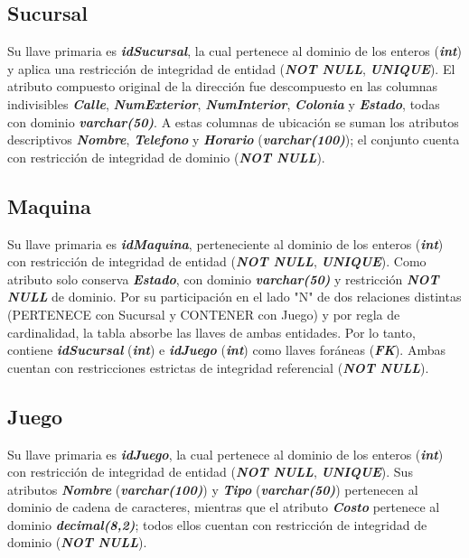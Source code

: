 \documentclass[11pt,letterpaper,spanish]{article}
\begin{document}
\subsection{Sucursal}
Su llave primaria es \textbf{\textit{idSucursal}}, la cual pertenece al dominio de los enteros (\textbf{\textit{int}}) y aplica una restricción de integridad de entidad (\textbf{\textit{NOT NULL}}, \textbf{\textit{UNIQUE}}). El atributo compuesto original de la dirección fue descompuesto en las columnas indivisibles \textbf{\textit{Calle}}, \textbf{\textit{NumExterior}}, \textbf{\textit{NumInterior}}, \textbf{\textit{Colonia}} y \textbf{\textit{Estado}}, todas con dominio \textbf{\textit{varchar(50)}}. A estas columnas de ubicación se suman los atributos descriptivos \textbf{\textit{Nombre}}, \textbf{\textit{Telefono}} y \textbf{\textit{Horario}} (\textbf{\textit{varchar(100)}}); el conjunto cuenta con restricción de integridad de dominio (\textbf{\textit{NOT NULL}}).

\subsection{Maquina}
Su llave primaria es \textbf{\textit{idMaquina}}, perteneciente al dominio de los enteros (\textbf{\textit{int}}) con restricción de integridad de entidad (\textbf{\textit{NOT NULL}}, \textbf{\textit{UNIQUE}}). Como atributo solo conserva \textbf{\textit{Estado}}, con dominio \textbf{\textit{varchar(50)}} y restricción \textbf{\textit{NOT NULL}} de dominio. Por su participación en el lado "N" de dos relaciones distintas (PERTENECE con Sucursal y CONTENER con Juego) y por regla de cardinalidad, la tabla absorbe las llaves de ambas entidades. Por lo tanto, contiene \textbf{\textit{idSucursal}} (\textbf{\textit{int}}) e \textbf{\textit{idJuego}} (\textbf{\textit{int}}) como llaves foráneas (\textbf{\textit{FK}}). Ambas cuentan con restricciones estrictas de integridad referencial (\textbf{\textit{NOT NULL}}).

\subsection{Juego}
Su llave primaria es \textbf{\textit{idJuego}}, la cual pertenece al dominio de los enteros (\textbf{\textit{int}}) con restricción de integridad de entidad (\textbf{\textit{NOT NULL}}, \textbf{\textit{UNIQUE}}). Sus atributos \textbf{\textit{Nombre}} (\textbf{\textit{varchar(100)}}) y \textbf{\textit{Tipo}} (\textbf{\textit{varchar(50)}}) pertenecen al dominio de cadena de caracteres, mientras que el atributo \textbf{\textit{Costo}} pertenece al dominio \textbf{\textit{decimal(8,2)}}; todos ellos cuentan con restricción de integridad de dominio (\textbf{\textit{NOT NULL}}).
\end{document}

